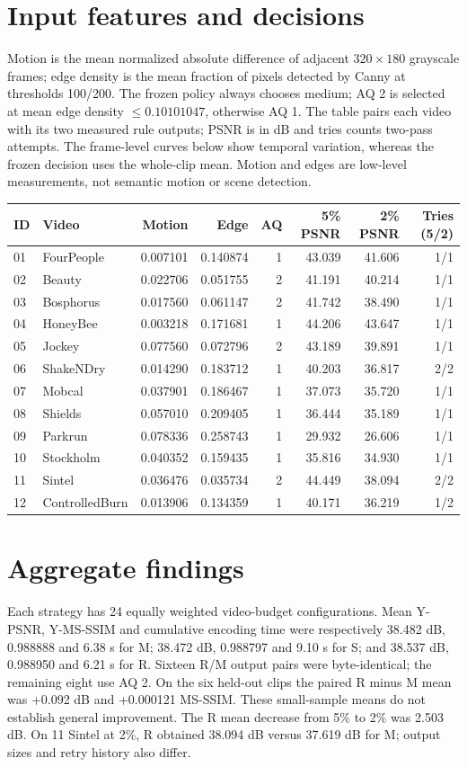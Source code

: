 \documentclass[10pt,a4paper]{article}
\begin{document}
\section{Input features and decisions}
Motion is the mean normalized absolute difference of adjacent $320\times180$ grayscale frames; edge density is the mean fraction of pixels detected by Canny at thresholds 100/200. The frozen policy always chooses medium; AQ 2 is selected at mean edge density $\leq0.10101047$, otherwise AQ 1. The table pairs each video with its two measured rule outputs; PSNR is in dB and tries counts two-pass attempts. The frame-level curves below show temporal variation, whereas the frozen decision uses the whole-clip mean. Motion and edges are low-level measurements, not semantic motion or scene detection.
\begin{center}\small\begin{tabular}{llrrrrrr}\toprule
ID & Video & Motion & Edge & AQ & 5\% PSNR & 2\% PSNR & Tries (5/2)\\\midrule
01 & FourPeople & 0.007101 & 0.140874 & 1 & 43.039 & 41.606 & 1/1 \\
02 & Beauty & 0.022706 & 0.051755 & 2 & 41.191 & 40.214 & 1/1 \\
03 & Bosphorus & 0.017560 & 0.061147 & 2 & 41.742 & 38.490 & 1/1 \\
04 & HoneyBee & 0.003218 & 0.171681 & 1 & 44.206 & 43.647 & 1/1 \\
05 & Jockey & 0.077560 & 0.072796 & 2 & 43.189 & 39.891 & 1/1 \\
06 & ShakeNDry & 0.014290 & 0.183712 & 1 & 40.203 & 36.817 & 2/2 \\
07 & Mobcal & 0.037901 & 0.186467 & 1 & 37.073 & 35.720 & 1/1 \\
08 & Shields & 0.057010 & 0.209405 & 1 & 36.444 & 35.189 & 1/1 \\
09 & Parkrun & 0.078336 & 0.258743 & 1 & 29.932 & 26.606 & 1/1 \\
10 & Stockholm & 0.040352 & 0.159435 & 1 & 35.816 & 34.930 & 1/1 \\
11 & Sintel & 0.036476 & 0.035734 & 2 & 44.449 & 38.094 & 2/2 \\
12 & ControlledBurn & 0.013906 & 0.134359 & 1 & 40.171 & 36.219 & 1/2 \\
\bottomrule\end{tabular}\end{center}
\section{Aggregate findings}
Each strategy has 24 equally weighted video-budget configurations. Mean Y-PSNR, Y-MS-SSIM and cumulative encoding time were respectively 38.482 dB, 0.988888 and 6.38 s for M; 38.472 dB, 0.988797 and 9.10 s for S; and 38.537 dB, 0.988950 and 6.21 s for R. Sixteen R/M output pairs were byte-identical; the remaining eight use AQ 2. On the six held-out clips the paired R minus M mean was +0.092 dB and +0.000121 MS-SSIM. These small-sample means do not establish general improvement. The R mean decrease from 5\% to 2\% was 2.503 dB. On 11 Sintel at 2\%, R obtained 38.094 dB versus 37.619 dB for M; output sizes and retry history also differ.
\end{document}
